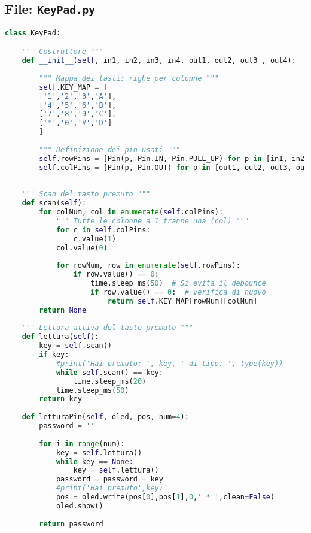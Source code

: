 \documentclass[12pt,a4paper]{article}
\begin{document}
\subsection{File: \texttt{KeyPad.py}}
\begin{lstlisting}[language=Python, caption={Questa classe gestisce il tastierino utilizzato e fornisce alcuni metodi di lettura. Il costruttore inizializza la mappa dei pulsanti del tastierino sottoforma di matrice. Poi inizializza i pin di input (relativi alle 4 righe del tastierino) e i pin di output (relativi alle 4 colonne del tastierino). Il metodo scan() serve per identificare quale tasto è premuto. Scorre tutte le colonne impostandole a 0 una alla volta; va poi a scorrere ogni riga: se il valore è 0 significa che c'è un contatto in quella riga e quella colonna. È presente il controllo sul debounce di 50ms. Il metodo lettura() rende la lettura dei tasti affidabile evitando che, tenendo premuto un tasto, questo venga letto più volte. Il metodo letturaPin() serve a leggere un pin lungo 4 caratteri di default.}]	
class KeyPad:

	""" Costruttore """
	def __init__(self, in1, in2, in3, in4, out1, out2, out3 , out4):
	
		""" Mappa dei tasti: righe per colonne """
		self.KEY_MAP = [
		['1','2','3','A'],
		['4','5','6','B'],
		['7','8','9','C'],
		['*','0','#','D']
		]
	
		""" Definizione dei pin usati """
		self.rowPins = [Pin(p, Pin.IN, Pin.PULL_UP) for p in [in1, in2, in3, in4]]
		self.colPins = [Pin(p, Pin.OUT) for p in [out1, out2, out3, out4]]
	
	
	""" Scan del tasto premuto """
	def scan(self):
		for colNum, col in enumerate(self.colPins):
			""" Tutte le colonne a 1 tranne una (col) """
			for c in self.colPins:
				c.value(1)
			col.value(0)
	
			for rowNum, row in enumerate(self.rowPins):
				if row.value() == 0:
					time.sleep_ms(50)  # Si evita il debounce
					if row.value() == 0:  # verifica di nuovo
						return self.KEY_MAP[rowNum][colNum]
		return None
	
	""" Lettura attiva del tasto premuto """
	def lettura(self):
		key = self.scan()
		if key:
			#print('Hai premuto: ', key, ' di tipo: ', type(key))
			while self.scan() == key:
				time.sleep_ms(20)
			time.sleep_ms(50)
		return key
	
	def letturaPin(self, oled, pos, num=4):
		password = ''
		
		for i in range(num):
			key = self.lettura()
			while key == None:
				key = self.lettura()
			password = password + key
			#print('Hai premuto',key)
			pos = oled.write(pos[0],pos[1],0,' * ',clean=False)
			oled.show()
		
		return password

\end{lstlisting}
\end{document}
